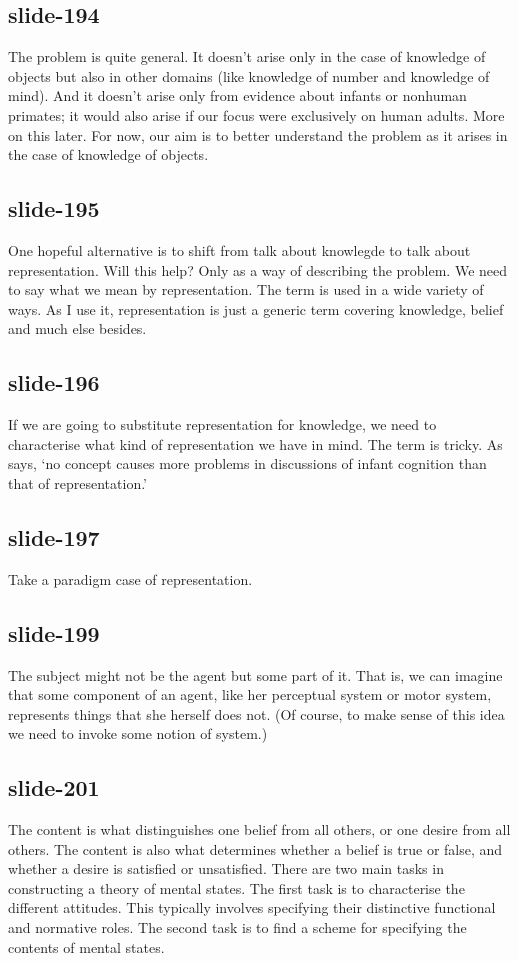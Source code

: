 \documentclass[12pt,\papersize]{extarticle}
\begin{document}
 
\subsection{slide-194}
The problem is quite general. It doesn't arise only in the case of knowledge of objects but also in other domains (like knowledge of number and knowledge of mind). And it doesn't arise only from evidence about infants or nonhuman primates; it would also arise if our focus were exclusively on human adults. More on this later. For now, our aim is to better understand the problem as it arises in the case of knowledge of objects.
 
 
\subsection{slide-195}
One hopeful alternative is to shift from talk about knowlegde to talk about representation.
Will this help?
Only as a way of describing the problem.
We need to say what we mean by representation. The term is used in a wide variety of ways. As I use it, representation is just a generic term covering knowledge, belief and much else besides.
 
 
\subsection{slide-196}
If we are going to substitute representation for knowledge, we need to characterise what kind of representation we have in mind. The term is tricky. As \citet{Haith:1998aq} says, ‘no concept causes more problems in discussions of infant cognition than that of representation.’
 
 
\subsection{slide-197}
Take a paradigm case of representation.
 
 
\subsection{slide-199}
The subject might not be the agent but some part of it.
That is, we can imagine that some component of an agent, like her perceptual system or motor system, represents things that she herself does not.
(Of course, to make sense of this idea we need to invoke some notion of system.)
 
 
\subsection{slide-201}
The content is what distinguishes one belief from all others, or one desire from all others.
The content is also what determines whether a belief is true or false, and whether a desire is satisfied or unsatisfied.
There are two main tasks in constructing a theory of mental states.
The first task is to characterise the different attitudes.
This typically involves specifying their distinctive functional and normative roles.
The second task is to find a scheme for specifying the contents of mental states.
 
\end{document}
